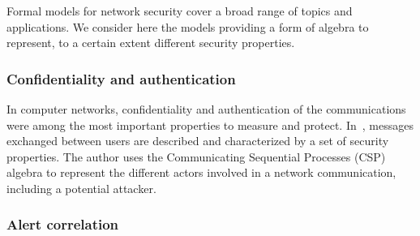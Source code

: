 \cite{M2D2-Morin2002,AICPub2006:2015,HLPSL-Chevalier2004,Marsalek2018,ISO/IEC270012013,abstraction-reitblatt2012,validation-naylor1967,M4D4-Morin2008,CSP-Schneider1996}

Formal models for network security cover a broad range of topics and applications.
We consider here the models providing a form of algebra to represent, to a certain extent different security properties.

\subsubsection{Confidentiality and authentication}
In computer networks, confidentiality and authentication of the communications were among the most important properties to measure and protect.
In~\cite{CSP-Schneider1996}, messages exchanged between users are described and characterized by a set of security properties.
The author uses the Communicating Sequential Processes (CSP) algebra to represent the different actors involved in a network communication, including a potential attacker.


\subsubsection{Alert correlation}